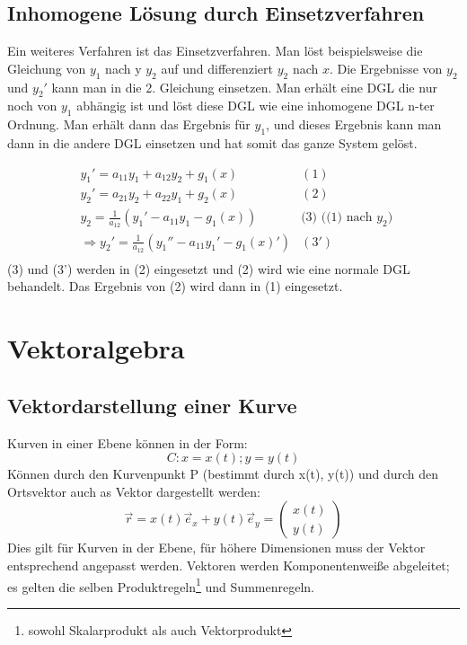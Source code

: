 \documentclass[a4paper,10pt]{scrartcl}
\begin{document}
        \subsection*{Inhomogene Lösung durch Einsetzverfahren}
            Ein weiteres Verfahren ist das Einsetzverfahren. Man löst beispielsweise die Gleichung von \(y_1\) nach y
            \(y_2\) auf und differenziert \(y_2\) nach \(x\). Die Ergebnisse von \(y_2\) und \(y_2'\) kann man in die 2. Gleichung einsetzen.
            Man erhält eine DGL die nur noch von \(y_1\) abhängig ist und löst diese DGL wie eine inhomogene DGL n-ter Ordnung. Man 
            erhält dann das Ergebnis für \(y_1\), und dieses Ergebnis kann man dann in die andere DGL einsetzen und hat somit das ganze System gelöst.
            
            \begin{equation*}
                \begin{aligned}
                    & y_1' = a_{11}y_1 + a_{12}y_2 + g_1(x) &  (1)\\
                    & y_2' = a_{21}y_2 + a_{22}y_1 + g_2(x) &  (2)\\
                    & y_2 = \frac{1}{a_{12}} (y_1' - a_{11}y_1 - g_1(x)) & \text{(3) ((1) nach  \(y_2\)) } \\
                    & \Rightarrow y_2' = \frac{1}{a_{12}} (y_1'' - a_{11}y_1' - g_1(x)') & (3') \\
                \end{aligned}
            \end{equation*}
            (3) und (3') werden in (2) eingesetzt und (2) wird wie eine normale DGL behandelt. Das Ergebnis von (2) wird dann in (1) eingesetzt.
    
    \section{Vektoralgebra}
        \subsection{Vektordarstellung einer Kurve}
        Kurven in einer Ebene können in der Form: 
        \begin{equation*}
            C: x = x(t); y = y(t)
        \end{equation*}
        Können durch den Kurvenpunkt P (bestimmt durch x(t), y(t)) und durch den Ortsvektor auch as Vektor dargestellt werden:
        \begin{equation*}
            \vec{r} = x(t)\vec{e}_x + y(t)\vec{e}_y = \begin{pmatrix} x(t) \\ y(t) \end{pmatrix}
        \end{equation*}
        Dies gilt für Kurven in der Ebene, für höhere Dimensionen muss der Vektor entsprechend angepasst werden. Vektoren werden Komponentenweiße abgeleitet;
        es gelten die selben Produktregeln\footnote{sowohl Skalarprodukt als auch Vektorprodukt} und Summenregeln. 
\end{document}
